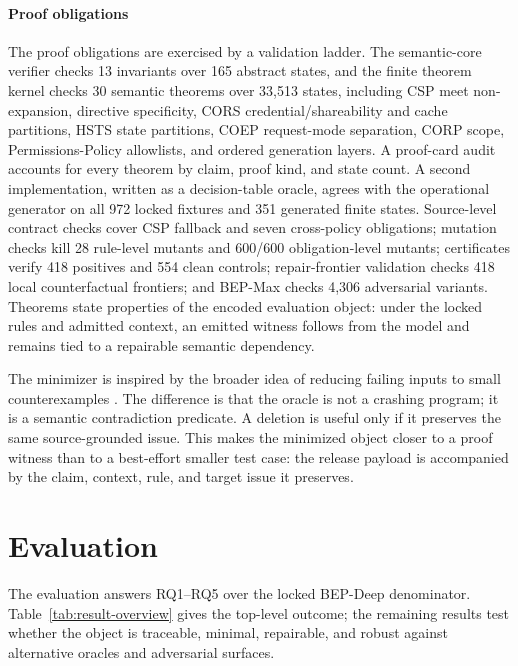 \documentclass[10pt,conference]{IEEEtran}
\begin{document}
\paragraph{Proof obligations}



The proof obligations are exercised by a validation ladder. The semantic-core verifier checks 13 invariants over 165 abstract states, and the finite theorem kernel checks 30 semantic theorems over 33,513 states, including CSP meet non-expansion, directive specificity, CORS credential/shareability and cache partitions, HSTS state partitions, COEP request-mode separation, CORP scope, Permissions-Policy allowlists, and ordered generation layers.  A proof-card audit accounts for every theorem by claim, proof kind, and state count.  A second implementation, written as a decision-table oracle, agrees with the operational generator on all 972 locked fixtures and 351 generated finite states.  Source-level contract checks cover CSP fallback and seven cross-policy obligations; mutation checks kill 28 rule-level mutants and 600/600 obligation-level mutants; certificates verify 418 positives and 554 clean controls; repair-frontier validation checks 418 local counterfactual frontiers; and BEP-Max checks 4,306 adversarial variants.  Theorems state properties of the encoded evaluation object: under the locked rules and admitted context, an emitted witness follows from the model and remains tied to a repairable semantic dependency.

The minimizer is inspired by the broader idea of reducing failing inputs to small counterexamples \cite{zeller_ddmin_2002}. The difference is that the oracle is not a crashing program; it is a semantic contradiction predicate. A deletion is useful only if it preserves the same source-grounded issue. This makes the minimized object closer to a proof witness than to a best-effort smaller test case: the release payload is accompanied by the claim, context, rule, and target issue it preserves.

\section{Evaluation}

The evaluation answers RQ1--RQ5 over the locked BEP-Deep denominator. Table~\ref{tab:result-overview} gives the top-level outcome; the remaining results test whether the object is traceable, minimal, repairable, and robust against alternative oracles and adversarial surfaces.
\end{document}
